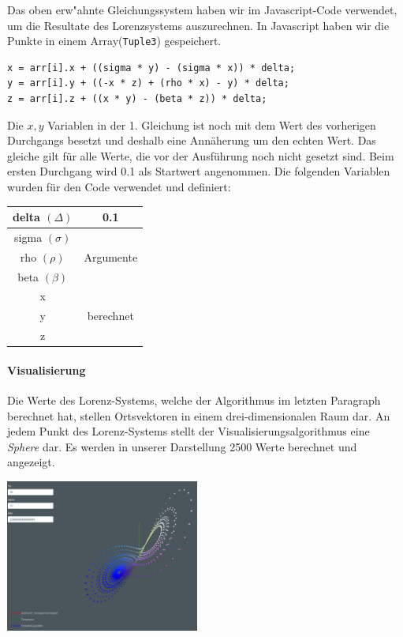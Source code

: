 \documentclass[implementation]{subfiles}
\begin{document}
	Das oben erw"ahnte Gleichungssystem haben wir im Javascript-Code verwendet, um die Resultate des Lorenzsystems auszurechnen. In Javascript haben wir die Punkte in einem Array(\texttt{Tuple3}) gespeichert.
	
	\begin{centerFigure}
		\begin{lstlisting}
x = arr[i].x + ((sigma * y) - (sigma * x)) * delta;
y = arr[i].y + ((-x * z) + (rho * x) - y) * delta;
z = arr[i].z + ((x * y) - (beta * z)) * delta;
		\end{lstlisting}
	\end{centerFigure}
	
	Die $ x, y $ Variablen in der 1. Gleichung ist noch mit dem Wert des vorherigen Durchgangs besetzt und deshalb eine Annäherung um den echten Wert. Das gleiche gilt für alle Werte, die vor der Ausführung noch nicht gesetzt sind. Beim ersten Durchgang wird 0.1 als Startwert angenommen. Die folgenden Variablen wurden für den Code verwendet und definiert:
	
	\begin{centerFigure}
		\begin{tabular}{| c | c |}
			\hline
			delta $ (\Delta) $ & 0.1 \\\hline
			sigma $ (\sigma) $ & \multirow{3}{*}{Argumente}\\
			rho $(\rho) $ & \\
			beta $ (\beta) $ & \\\hline
			x & \multirow{3}{*}{berechnet}\\
			y & \\
			z & \\\hline
		\end{tabular}
	\end{centerFigure}

	\paragraph{Visualisierung}
	Die Werte des Lorenz-Systems, welche der Algorithmus im letzten Paragraph berechnet hat, stellen Ortsvektoren in einem drei-dimensionalen Raum dar. An jedem Punkt des Lorenz-Systems stellt der Visualisierungsalgorithmus eine \textit{Sphere} dar. Es werden in unserer Darstellung 2500 Werte berechnet und angezeigt.
	
	\begin{centerFigure}
		\includegraphics[height=5cm]{assets/implementation/Visualisierung}
	\end{centerFigure}
\end{document}
